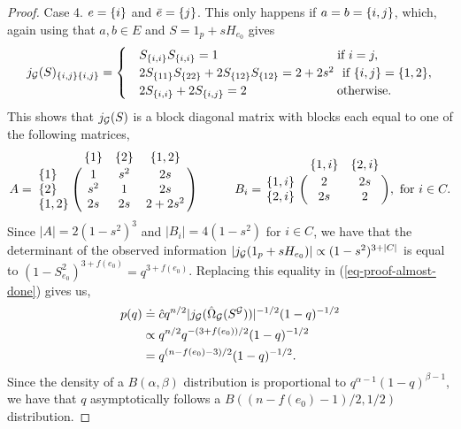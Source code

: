 \begin{proof}
    Case 4. $e = {\left\{i\right\}}$ and $\bar e = {\left\{j\right\}}$. This only happens if $a = b = {\left\{i, j\right\}}$, which, again using that $a, b \in E$ and $S = 1_p + sH_{e_0}$ gives
    \begin{equation*}
        j_\G(S)_{\eset{i, j} \eset{i, j}} = \begin{cases}
            &S_\eset{i, i}S_\eset{i, i} = 1\ \ \ \ \ \ \ \ \ \ \ \ \ \ \ \ \ \ \ \ \ \ \ \ \ \ \ \  \t{ if } i = j,\\
            &2S_\eset{1 1}S_\eset{2 2} + 2S_\eset{1 2}S_\eset{1 2} = 2 + 2s^2\  \t{ if } \eset{i, j} = \eset{1, 2},\\
            &2S_\eset{i,i} + 2S_\eset{i, j} = 2\ \ \ \ \ \ \ \ \ \ \ \ \ \ \ \ \ \ \ \ \  \t{ otherwise.}
        \end{cases}
    \end{equation*}
    This shows that $j_{\mathcal{G}}(S)$ is a block diagonal matrix with blocks each equal to one of the following matrices,
    \begin{equation*}
        A = \bordermatrix{~ & \eset{1} & \eset{2} & \eset{1, 2} \cr
            \eset{1} & 1 & s^2 & 2s \cr
            \eset{2} & s^2 & 1 & 2s \cr
            \eset{1, 2} & 2s & 2s & 2 + 2s^2 \cr
        }
        \ \ \ \ \ \ \ \ \ 
        B_i = \bordermatrix{~ & \eset{1, i} & \eset{2, i} \cr
            \eset{1, i} & 2 & 2s \cr
            \eset{2, i} & 2s & 2 \cr
        }, \t{ for } i \in C.
    \end{equation*}
    Since $|A| = 2 (1-s^2)^3$ and $|B_i| = 4(1-s^2)$ for $i \in C$, we have that the determinant of the observed information $\left|j_{\mathcal{G}}(1_p + sH_{e_0})\right| \propto (1-s^2)^{3 + |C|}$ is equal to $(1 - S_{e_0}^2)^{3 + f(e_0)} = q^{3 + f(e_0)}$. Replacing this equality in (\ref{eq-proof-almost-done}) gives us,
    \begin{align*}
        p(q) 
        &\doteq \hat c q^{n/2} |j_{{\mathcal{G}}}(\hat\Omega_{{\mathcal{G}}}(S^{{\mathcal{G}}})) |^{-1/2} (1 - q)^{-1/2}\\
        &\propto q^{n/2} q^{-(3 + f(e_0))/2} (1 - q)^{-1/2} \\
        &= q^{(n - f(e_0) - 3)/2}(1-q)^{-1/2}.
    \end{align*}
    Since the density of a $B(\alpha, \beta)$ distribution is proportional to $q^{\alpha-1}(1-q)^{\beta-1}$, we have that $q$ asymptotically follows a $B((n - f(e_0) - 1)/2, 1/2)$ distribution.
\end{proof}

